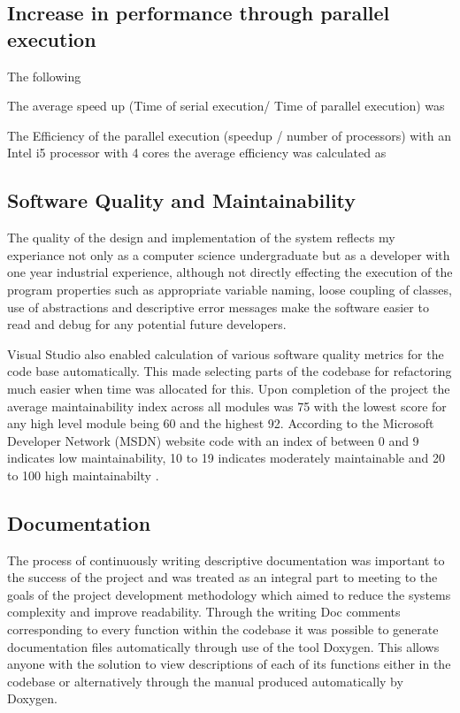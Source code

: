 \subsection{Increase in performance through parallel execution}
The following 

The average speed up (Time of serial execution/ Time of parallel execution) was 


The Efficiency of the parallel execution (speedup / number of processors) with an Intel i5 processor with 4 cores the average efficiency  was calculated as

\subsection{Software Quality and Maintainability}
The quality of the design and implementation of the system reflects my experiance not only as a computer science undergraduate but as a developer with one year industrial experience, although not directly effecting the execution of the program properties such as appropriate variable naming, loose coupling of classes, use of abstractions and descriptive error messages make the software easier to read and debug for any potential future developers. 

Visual Studio also enabled calculation of various software quality metrics for the code base automatically. This made selecting parts of the codebase for refactoring much easier when time was allocated for this. Upon completion of the project the average maintainability index across all modules was 75 with the lowest score for any high level module being 60 and the highest 92. According to the Microsoft Developer Network (MSDN) website code with an index of between 0 and 9 indicates low maintainability, 10 to 19 indicates moderately maintainable and 20 to 100 high maintainabilty \cite{VisualStudioMaintainIndex}.

\subsection{Documentation}
The process of continuously writing descriptive documentation was important to the success of the project and was treated as an integral part to meeting to the goals of the project development methodology which aimed to reduce the systems complexity and improve readability. Through the writing Doc comments corresponding to every function within the codebase it was possible to generate documentation files automatically through use of the tool Doxygen. This allows anyone with the solution to view descriptions of each of its functions either in the codebase or alternatively through the manual produced automatically by Doxygen.
 


